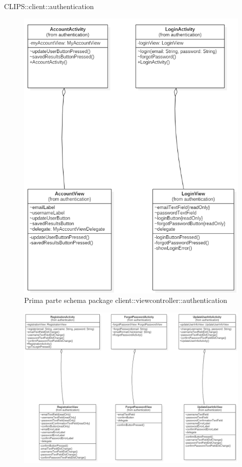 \begin{componente}{CLIPS::client::authentication}
\begin{figure}[h!]
\centering
\includegraphics[scale=0.4]{img/package/png/client--viewcontroller--authentication1.png}
\caption{Prima parte schema package client::viewcontroller::authentication}
 \end{figure}
 \begin{figure}[h!]
 	\centering
 	\includegraphics[scale=0.4]{img/package/png/client--viewcontroller--authentication2.png}

\end{figure}
\end{componente}
